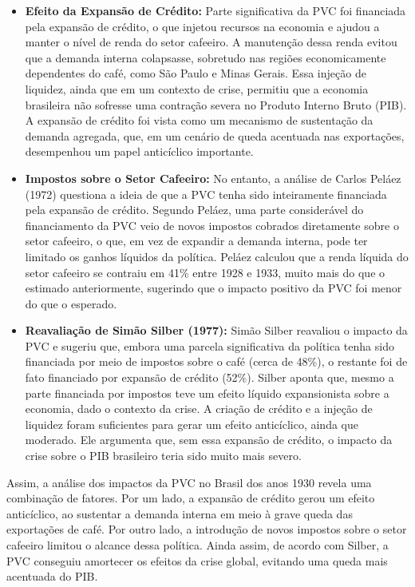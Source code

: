 \documentclass[a4paper,12pt]{article}[abntex2]
\begin{document}
\begin{itemize}
    \item \textbf{Efeito da Expansão de Crédito:} 
    Parte significativa da PVC foi financiada pela expansão de crédito, o que injetou recursos na economia e ajudou a manter o nível de renda do setor cafeeiro. A manutenção dessa renda evitou que a demanda interna colapsasse, sobretudo nas regiões economicamente dependentes do café, como São Paulo e Minas Gerais. Essa injeção de liquidez, ainda que em um contexto de crise, permitiu que a economia brasileira não sofresse uma contração severa no Produto Interno Bruto (PIB). A expansão de crédito foi vista como um mecanismo de sustentação da demanda agregada, que, em um cenário de queda acentuada nas exportações, desempenhou um papel anticíclico importante.

    \item \textbf{Impostos sobre o Setor Cafeeiro:}
    No entanto, a análise de Carlos Peláez (1972) questiona a ideia de que a PVC tenha sido inteiramente financiada pela expansão de crédito. Segundo Peláez, uma parte considerável do financiamento da PVC veio de novos impostos cobrados diretamente sobre o setor cafeeiro, o que, em vez de expandir a demanda interna, pode ter limitado os ganhos líquidos da política. Peláez calculou que a renda líquida do setor cafeeiro se contraiu em 41\% entre 1928 e 1933, muito mais do que o estimado anteriormente, sugerindo que o impacto positivo da PVC foi menor do que o esperado.

    \item \textbf{Reavaliação de Simão Silber (1977):}
    Simão Silber reavaliou o impacto da PVC e sugeriu que, embora uma parcela significativa da política tenha sido financiada por meio de impostos sobre o café (cerca de 48\%), o restante foi de fato financiado por expansão de crédito (52\%). Silber aponta que, mesmo a parte financiada por impostos teve um efeito líquido expansionista sobre a economia, dado o contexto da crise. A criação de crédito e a injeção de liquidez foram suficientes para gerar um efeito anticíclico, ainda que moderado. Ele argumenta que, sem essa expansão de crédito, o impacto da crise sobre o PIB brasileiro teria sido muito mais severo.

\end{itemize}

Assim, a análise dos impactos da PVC no Brasil dos anos 1930 revela uma combinação de fatores. Por um lado, a expansão de crédito gerou um efeito anticíclico, ao sustentar a demanda interna em meio à grave queda das exportações de café. Por outro lado, a introdução de novos impostos sobre o setor cafeeiro limitou o alcance dessa política. Ainda assim, de acordo com Silber, a PVC conseguiu amortecer os efeitos da crise global, evitando uma queda mais acentuada do PIB.
\end{document}
